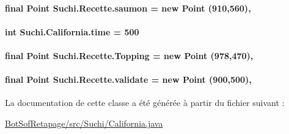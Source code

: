 \paragraph[{saumon}]{\setlength{\rightskip}{0pt plus 5cm}final Point Suchi.\+Recette.\+saumon = new Point (910,560)\hspace{0.3cm}{\ttfamily [protected]}, {\ttfamily [inherited]}}\label{classSuchi_1_1Recette_a17aeabd21e3d4d55d7caae9a40bfc6a1}
\hypertarget{classSuchi_1_1California_aaa8bb7f8291c62319446ba91241ba161}{}
\paragraph[{time}]{\setlength{\rightskip}{0pt plus 5cm}int Suchi.\+California.\+time = 500\hspace{0.3cm}{\ttfamily [private]}}\label{classSuchi_1_1California_aaa8bb7f8291c62319446ba91241ba161}
\hypertarget{classSuchi_1_1Recette_a4810b2254c050209fba27757066668b3}{}
\paragraph[{Topping}]{\setlength{\rightskip}{0pt plus 5cm}final Point Suchi.\+Recette.\+Topping = new Point (978,470)\hspace{0.3cm}{\ttfamily [protected]}, {\ttfamily [inherited]}}\label{classSuchi_1_1Recette_a4810b2254c050209fba27757066668b3}
\hypertarget{classSuchi_1_1Recette_aff16265c9b0b819091af71f64ef84be7}{}
\paragraph[{validate}]{\setlength{\rightskip}{0pt plus 5cm}final Point Suchi.\+Recette.\+validate = new Point (900,500)\hspace{0.3cm}{\ttfamily [protected]}, {\ttfamily [inherited]}}\label{classSuchi_1_1Recette_aff16265c9b0b819091af71f64ef84be7}


La documentation de cette classe a été générée à partir du fichier suivant \+:\begin{DoxyCompactItemize}
\item 
\hyperlink{BotSofRetapage_2src_2Suchi_2California_8java}{Bot\+Sof\+Retapage/src/\+Suchi/\+California.\+java}\end{DoxyCompactItemize}

